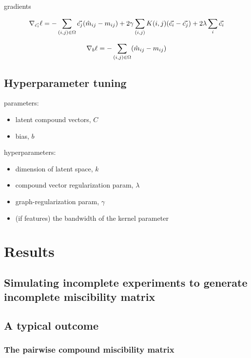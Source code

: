 \documentclass[11pt, oneside]{article}
\begin{document}
gradients

\begin{equation*}
     \nabla_{\vec{c_i}}\ell = -\sum_{(i,j) \in \Omega} \vec{c_j} (\hat{m}_{ij} -m_{ij}) +  2\gamma \sum_{(i,j)} K(i,j)( \vec{c_i} - \vec{c_j}) + 2\lambda \sum_{i} \vec{c_i} \\
\end{equation*}

\begin{equation*}
     \nabla_b\ell = -\sum_{(i,j) \in \Omega}  (\hat{m}_{ij} -m_{ij})  \\
\end{equation*}


\subsection{Hyperparameter tuning}
parameters: 
\begin{itemize}	
	\item latent compound vectors, $C$
	\item bias, $b$
\end{itemize}
hyperparameters:
\begin{itemize}	
	\item dimension of latent space, $k$ 
	\item compound vector regularization param, $\lambda$
	\item graph-regularization param, $\gamma$
	\item (if features) the bandwidth of the kernel parameter
\end{itemize}


\section{Results}

\subsection{Simulating incomplete experiments to generate incomplete miscibility matrix}

\subsection{A typical outcome}
\subsubsection{The pairwise compound miscibility matrix}
\end{document}
